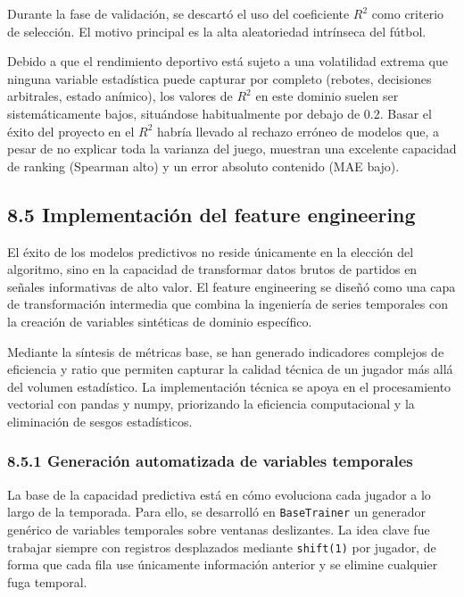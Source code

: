 Durante la fase de validación, se descartó el uso del coeficiente $R^2$ como criterio de selección. El motivo principal es la alta aleatoriedad intrínseca del fútbol.

Debido a que el rendimiento deportivo está sujeto a una volatilidad extrema que ninguna variable estadística puede capturar por completo (rebotes, 
decisiones arbitrales, estado anímico), los valores de $R^2$ en este dominio suelen ser sistemáticamente bajos, situándose habitualmente por debajo de 0.2. 
Basar el éxito del proyecto en el $R^2$ habría llevado al rechazo erróneo de modelos que, a pesar de no explicar toda la varianza del juego, muestran una
 excelente capacidad de ranking (Spearman alto) y un error absoluto contenido (MAE bajo).

\subsection{8.5 Implementación del feature engineering}

El éxito de los modelos predictivos no reside únicamente en la elección del algoritmo, sino en la capacidad de transformar datos brutos de partidos en 
señales informativas de alto valor. El feature engineering se diseñó como una capa de transformación intermedia que combina la ingeniería de series temporales
 con la creación de variables sintéticas de dominio específico.
 
 Mediante la síntesis de métricas base, se han generado indicadores complejos de eficiencia y 
 ratio que permiten capturar la calidad técnica de un jugador más allá del volumen estadístico. La implementación técnica se apoya en el procesamiento vectorial
  con pandas y numpy, priorizando la eficiencia computacional y la eliminación de sesgos estadísticos.

\subsubsection{8.5.1 Generación automatizada de variables temporales}

La base de la capacidad predictiva está en cómo evoluciona cada jugador a lo largo de la temporada. Para ello, se desarrolló en \texttt{BaseTrainer} un generador
 genérico de variables temporales sobre ventanas deslizantes. La idea clave fue trabajar siempre con registros desplazados mediante \texttt{shift(1)} por jugador,
  de forma que cada fila use únicamente información anterior y se elimine cualquier fuga temporal.

